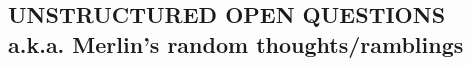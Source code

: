%
%


%




\subsection{UNSTRUCTURED OPEN QUESTIONS \\ a.k.a. Merlin's random thoughts/ramblings}\label{sec:calibQuestions}

